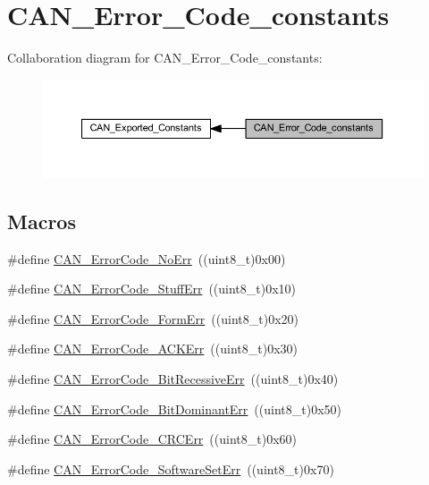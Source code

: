 \hypertarget{group___c_a_n___error___code__constants}{}\section{C\+A\+N\+\_\+\+Error\+\_\+\+Code\+\_\+constants}
\label{group___c_a_n___error___code__constants}
Collaboration diagram for C\+A\+N\+\_\+\+Error\+\_\+\+Code\+\_\+constants\+:
\nopagebreak
\begin{figure}[H]
\begin{center}
\leavevmode
\includegraphics[width=350pt]{group___c_a_n___error___code__constants}
\end{center}
\end{figure}
\subsection*{Macros}
\begin{DoxyCompactItemize}
\item 
\#define \hyperlink{group___c_a_n___error___code__constants_ga025d891e9c5cec2cfecb2213b4f74a9e}{C\+A\+N\+\_\+\+Error\+Code\+\_\+\+No\+Err}~((uint8\+\_\+t)0x00)
\item 
\#define \hyperlink{group___c_a_n___error___code__constants_gaa733d1c078472912c3bf60fbdc53734d}{C\+A\+N\+\_\+\+Error\+Code\+\_\+\+Stuff\+Err}~((uint8\+\_\+t)0x10)
\item 
\#define \hyperlink{group___c_a_n___error___code__constants_ga1fe585558bb8d5c834b4266661392cb2}{C\+A\+N\+\_\+\+Error\+Code\+\_\+\+Form\+Err}~((uint8\+\_\+t)0x20)
\item 
\#define \hyperlink{group___c_a_n___error___code__constants_gad47e6af0116d1b6de85e29286c0b8607}{C\+A\+N\+\_\+\+Error\+Code\+\_\+\+A\+C\+K\+Err}~((uint8\+\_\+t)0x30)
\item 
\#define \hyperlink{group___c_a_n___error___code__constants_gaf800de7683f1d22194e1df8eb3b1c5bb}{C\+A\+N\+\_\+\+Error\+Code\+\_\+\+Bit\+Recessive\+Err}~((uint8\+\_\+t)0x40)
\item 
\#define \hyperlink{group___c_a_n___error___code__constants_gaa19708aa85d1a34f8f7f25a2bfe88b19}{C\+A\+N\+\_\+\+Error\+Code\+\_\+\+Bit\+Dominant\+Err}~((uint8\+\_\+t)0x50)
\item 
\#define \hyperlink{group___c_a_n___error___code__constants_gafa75157442dba7ba1a91036242b78e92}{C\+A\+N\+\_\+\+Error\+Code\+\_\+\+C\+R\+C\+Err}~((uint8\+\_\+t)0x60)
\item 
\#define \hyperlink{group___c_a_n___error___code__constants_ga927089dd74347b9fea7a7c59f3840a7c}{C\+A\+N\+\_\+\+Error\+Code\+\_\+\+Software\+Set\+Err}~((uint8\+\_\+t)0x70)
\end{DoxyCompactItemize}


